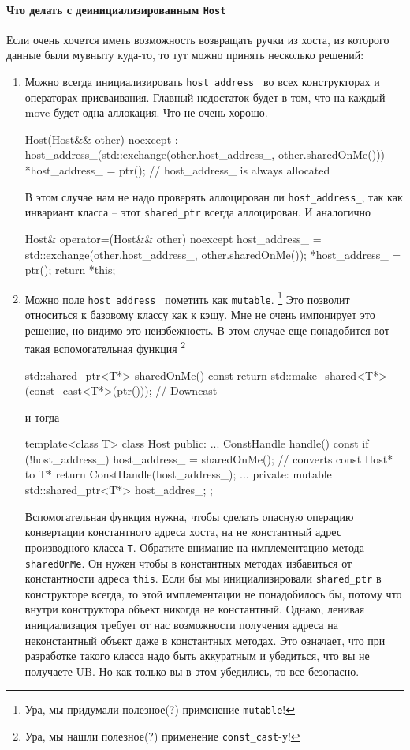 \paragraph{Что делать с деинициализированным \texttt{Host}}

Если очень хочется иметь возможность возвращать ручки из хоста, из которого данные были мувныту куда-то, то тут можно принять несколько решений:
\begin{enumerate}
\item Можно всегда инициализировать \verb"host_address_" во всех конструкторах и операторах присваивания.
Главный недостаток будет в том, что на каждый move будет одна аллокация.
Что не очень хорошо.
\begin{cppcode}
  Host(Host&& other) noexcept 
  : host_address_(std::exchange(other.host_address_, other.sharedOnMe())) {
    *host_address_ = ptr(); // host_address_ is always allocated
  } 
\end{cppcode}
В этом случае нам не надо проверять аллоцирован ли \verb"host_address_", так как инвариант класса -- этот \verb"shared_ptr" всегда аллоцирован.
И аналогично
\begin{cppcode}
Host& operator=(Host&& other) noexcept {
  host_address_ = std::exchange(other.host_address_, other.sharedOnMe());
  *host_address_ = ptr();
  return *this;
}
\end{cppcode}

\item Можно поле \verb"host_address_" пометить как \verb"mutable".%
\footnote{Ура, мы придумали полезное(?) применение \texttt{mutable}!}
Это позволит относиться к базовому классу как к кэшу.
Мне не очень импонирует это решение, но видимо это неизбежность.
В этом случае еще понадобится вот такая вспомогательная функция%
\footnote{Ура, мы нашли полезное(?) применение \texttt{const\_cast}-у!}
\begin{cppcode}
std::shared_ptr<T*> sharedOnMe() const {
  return std::make_shared<T*>(const_cast<T*>(ptr())); } // Downcast
\end{cppcode}
и тогда
\begin{cppcode}
template<class T>
class Host {
public:
  ...
  ConstHandle handle() const{
    if (!host_address_)
      host_address_ = sharedOnMe();  // converts const Host* to T*
    return ConstHandle(host_address_);
  }
  ...
private:
  mutable std::shared_ptr<T*> host_addres_;
};
\end{cppcode}
Вспомогательная функция нужна, чтобы сделать опасную операцию конвертации константного адреса хоста, на не константный адрес производного класса \verb"T".
Обратите внимание на имплементацию метода \verb"sharedOnMe".
Он нужен чтобы в константных методах избавиться от константности адреса \verb"this".
Если бы мы инициализировали \verb"shared_ptr" в конструкторе всегда, то этой имплементации не понадобилось бы, потому что внутри конструктора объект никогда не константный.
Однако, ленивая инициализация требует от нас возможности получения адреса на неконстантный объект даже в константных методах.
Это означает, что при разработке такого класса надо быть аккуратным и убедиться, что вы не получаете UB.
Но как только вы в этом убедились, то все безопасно.


\end{enumerate}
